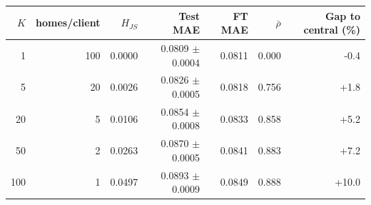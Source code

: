 \begin{tabular}{rrrrrrr}
\toprule
$K$ & homes/client & $H_{JS}$ & Test MAE & FT MAE & $\bar\rho$ & Gap to central (\%) \\
\midrule
1 & 100 & 0.0000 & 0.0809 $\pm$ 0.0004 & 0.0811 & 0.000 & -0.4 \\
5 & 20 & 0.0026 & 0.0826 $\pm$ 0.0005 & 0.0818 & 0.756 & +1.8 \\
20 & 5 & 0.0106 & 0.0854 $\pm$ 0.0008 & 0.0833 & 0.858 & +5.2 \\
50 & 2 & 0.0263 & 0.0870 $\pm$ 0.0005 & 0.0841 & 0.883 & +7.2 \\
100 & 1 & 0.0497 & 0.0893 $\pm$ 0.0009 & 0.0849 & 0.888 & +10.0 \\
\bottomrule
\end{tabular}
